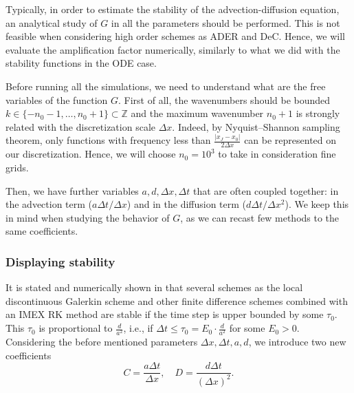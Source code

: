 Typically, in order to estimate the stability of the advection-diffusion equation, an analytical study of $G$ in all the parameters should be performed. 
This is not feasible when considering high order schemes as ADER and DeC.
Hence, we will evaluate the amplification factor numerically, similarly to what we did with the stability functions in the ODE case.

Before running all the simulations, we need to understand what are the free variables of the function $G$. First of all, the wavenumbers  should be bounded $k \in \lbrace -n_0-1 , \dots, n_0+1 \rbrace \subset \mathbb Z$ and the maximum wavenumber $n_0+1$ is strongly related with the discretization scale $\Delta x$. Indeed, by  Nyquist–Shannon sampling theorem, only functions with frequency less than $\frac{|x_J-x_0|}{2\Delta x}$ can be represented on our discretization. Hence, we will choose $n_0=10^3$ to take in consideration fine grids.

Then, we have further variables $a,d,\Delta x,\Delta t $ that are often coupled together: in the advection term ($a\Delta t/\Delta x$) and in the diffusion term ($d\Delta t/\Delta x^2$). We keep this in mind when studying the behavior of $G$, as we can recast few methods to the same coefficients.

\subsubsection{Displaying stability}
It is stated and numerically shown in \cite{TanChenShu_ImEx_Stability, WangShuZhang_LDG1_2015,WangShuZhang_LDG_2016} that several schemes as the local discontinuous Galerkin scheme \cite{WangShuZhang_LDG1_2015,WangShuZhang_LDG_2016} and other finite difference schemes combined with an IMEX RK method are stable if the time step is upper bounded by some $\tau_0$. This $\tau_0$ is proportional to $\frac{d}{a^2}$, i.e., if $\Delta t\le\tau_0= E_0\cdot \frac{d}{a^2}$ for some $E_0>0$.
Considering the before mentioned parameters $\Delta x, \Delta t, a,d$, we introduce two new coefficients
\begin{equation}
C=\frac{a\Delta t}{\Delta x}, \quad D=\frac{d\Delta t}{{(\Delta x)}^2}.
\end{equation}

